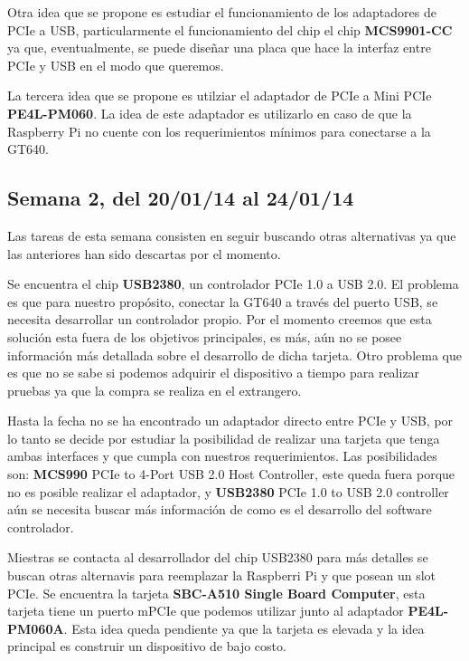 \documentclass[11pt,oneside,titlepage]{article}
\begin{document}
Otra idea que se propone es estudiar el funcionamiento de los adaptadores de PCIe a USB, particularmente el funcionamiento del chip el chip \textbf{MCS9901-CC} ya que, eventualmente, se puede diseñar una placa que hace la interfaz entre PCIe y USB en el modo que queremos.

La tercera idea que se propone es utilziar el adaptador de PCIe a Mini PCIe \textbf{PE4L-PM060}. La idea de este adaptador es utilizarlo en caso de que la Raspberry Pi no cuente con los requerimientos mínimos para conectarse a la GT640.

\subsection*{Semana 2, del 20/01/14 al 24/01/14}

Las tareas de esta semana consisten en seguir buscando otras alternativas ya que las
anteriores han sido descartas por el momento.

Se encuentra el chip \textbf{USB2380}, un controlador
PCIe 1.0 a USB 2.0. El problema es que para nuestro propósito, conectar la GT640 a través del puerto USB, se necesita
desarrollar un controlador propio. Por el momento creemos que esta solución esta
fuera de los objetivos principales, es más, aún no se posee información más
detallada sobre el desarrollo de dicha tarjeta. Otro problema que es que no
se sabe si podemos adquirir el dispositivo a tiempo para realizar pruebas ya que la compra se realiza en el extrangero.

Hasta la fecha no se ha encontrado un adaptador directo entre PCIe y USB, por lo tanto se decide por
estudiar la posibilidad de realizar una tarjeta que tenga ambas interfaces y que
cumpla con nuestros requerimientos. Las posibilidades son: \textbf{MCS990} PCIe
to 4-Port USB 2.0 Host Controller, este queda fuera porque no es posible realizar el adaptador,  y \textbf{USB2380} PCIe 1.0 to USB 2.0 controller aún se necesita buscar más información de como es el desarrollo del software controlador.

Miestras se contacta al desarrollador del chip USB2380 para más detalles se buscan otras alternavis para reemplazar la Raspberri Pi y que posean un slot PCIe. Se encuentra la tarjeta \textbf{SBC-A510 Single Board Computer}, esta tarjeta tiene un puerto mPCIe que podemos utilizar junto al adaptador \textbf{PE4L-PM060A}. Esta idea queda pendiente ya que la tarjeta es elevada y la idea principal es construir un dispositivo de bajo costo.
\end{document}
